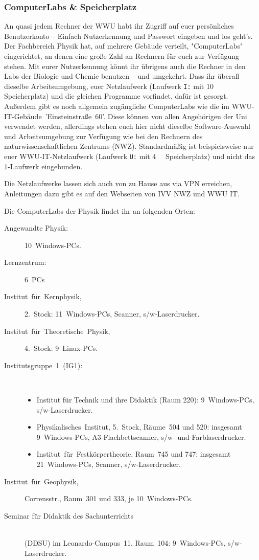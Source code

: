 \begin{multicols}{2}
\subsubsection{ComputerLabs \& Speicherplatz}
An quasi jedem Rechner der WWU habt ihr Zugriff auf euer persönliches Benutzerkonto -- Einfach Nutzerkennung und Passwort eingeben und los geht's.
Der Fachbereich Physik hat, auf mehrere Gebäude verteilt, "ComputerLabs" eingerichtet, an denen eine große Zahl an Rechnern für euch zur Verfügung stehen.
Mit eurer Nutzerkennung könnt ihr übrigens auch die Rechner in den Labs der Biologie und Chemie benutzen -- und umgekehrt.
Dass ihr überall dieselbe Arbeitsumgebung, euer Netzlaufwerk (Laufwerk \texttt{I:} mit \SI{10}{\giga\byte} Speicherplatz) und die gleichen Programme vorfindet, dafür ist gesorgt.
Außerdem gibt es noch allgemein zugängliche ComputerLabs wie die im WWU-IT-Gebäude~'Einsteinstraße~60'.
Diese können von allen Angehörigen der Uni verwendet werden, allerdings stehen euch hier nicht dieselbe Software-Auswahl und Arbeitsumgebung zur Verfügung wie bei den Rechnern des naturwissenschaftlichen Zentrums (NWZ).
Standardmäßig ist beispielsweise nur euer WWU-IT-Netzlaufwerk (Laufwerk \texttt{U:} mit \SI{4}{\giga\byte} Speicherplatz) und nicht das \texttt{I}-Laufwerk eingebunden.

Die Netzlaufwerke lassen sich auch von zu Hause aus via VPN erreichen, Anleitungen dazu gibt es auf den Webseiten von IVV NWZ und WWU IT.

Die ComputerLabs der Physik findet ihr an folgenden Orten:
\begin{description}
	\item[Angewandte Physik:] 10~Windows-PCs.
	\item[Lernzentrum:] 6~PCs
	\item[Institut~für~Kernphysik,] 2.~Stock: 11~Windows-PCs, Scanner, s/w-Laserdrucker.
	\item[Institut~für~Theoretische~Physik,] 4.~Stock: 9~Linux-PCs.
	\item[Institutsgruppe~1~(IG1):]~
		\begin{itemize}[leftmargin=1mm]
			\item Institut für Technik und ihre Didaktik (Raum 220): 9~Windows-PCs, s/w-Laserdrucker.
			\item Physikalisches~Institut, 5.~Stock, Räume~504 und 520: insgesamt 9~Windows-PCs, A3-Flachbettscanner, s/w- und Farblaserdrucker.
			\item Institut~für~Festkörpertheorie, Raum~745 und 747: insgesamt 21~Windows-PCs, Scanner, s/w-Laserdrucker.
		\end{itemize}
	\item[Institut~für~Geophysik,] Corrensstr., Raum~301 und 333, je 10~Windows-PCs.
	\item[Seminar für Didaktik des Sachunterrichts]~\\(DDSU) im Leonardo-Campus~11, Raum~104: 9~Windows-PCs, s/w-Laserdrucker.
\end{description}


\end{multicols}
